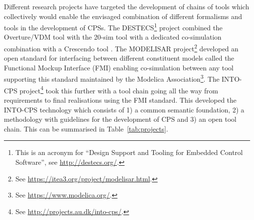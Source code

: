 Different research projects have targeted the development of chains of tools which collectively would enable the envisaged combination of different formalisms and tools in the development of CPSs. The DESTECS\footnote{This is an acronym for ``Design Support and Tooling for Embedded Control Software'', see \url{http://destecs.org/}.} project \cite{Broenink&10} combined the Overture/VDM tool \cite{Larsen&10a} with the 20-sim tool \cite{Kleijn06} with a dedicated co-simulation combination with a Crescendo tool \cite{Fitzgerald&14c}. The MODELISAR project\footnote{See \url{https://itea3.org/project/modelisar.html}.} developed an open standard for interfacing between different constituent models called the Functional Mockup Interface (FMI) enabling co-simulation between any tool supporting this standard maintained by the Modelica Association\footnote{See \url{https://www.modelica.org/}.}. The INTO-CPS project\footnote{See \url{http://projects.au.dk/into-cps/}.} took this further with a tool chain going all the way from requirements to final realisations using the FMI standard. This developed the INTO-CPS technology which consists of 1) a common semantic foundation, 2) a methodology with guidelines for the development of CPS and 3) an open tool chain. This can be summarised in Table~\ref{tab:projects}.

